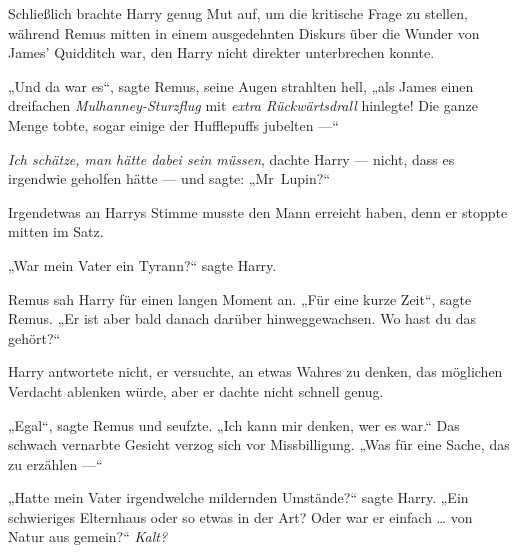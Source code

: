 Schließlich brachte Harry genug Mut auf, um die kritische Frage zu stellen, während Remus mitten in einem ausgedehnten Diskurs über die Wunder von James’ Quidditch war, den Harry nicht direkter unterbrechen konnte.

„Und da war es“, sagte Remus, seine Augen strahlten hell,
„als James einen dreifachen \emph{Mulhanney-Sturzflug} mit \emph{extra Rückwärtsdrall} hinlegte! Die ganze Menge tobte, sogar einige der Hufflepuffs jubelten —“

\emph{Ich schätze, man hätte dabei sein müssen}, dachte Harry — nicht, dass es irgendwie geholfen hätte — und sagte:
„Mr~Lupin?“

Irgendetwas an Harrys Stimme musste den Mann erreicht haben, denn er stoppte mitten im Satz.

„War mein Vater ein Tyrann?“ sagte Harry.

Remus sah Harry für einen langen Moment an.
„Für eine kurze Zeit“, sagte Remus.
„Er ist aber bald danach darüber hinweggewachsen. Wo hast du das gehört?“

Harry antwortete nicht, er versuchte, an etwas Wahres zu denken, das möglichen Verdacht ablenken würde, aber er dachte nicht schnell genug.

„Egal“, sagte Remus und seufzte.
„Ich kann mir denken, wer es war.“ Das schwach vernarbte Gesicht verzog sich vor Missbilligung.
„Was für eine Sache, das zu erzählen —“

„Hatte mein Vater irgendwelche mildernden Umstände?“ sagte Harry.
„Ein schwieriges Elternhaus oder so etwas in der Art? Oder war er einfach … von Natur aus gemein?“ \emph{Kalt?}

